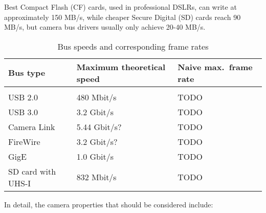 Best Compact Flash (CF) cards, used in professional DSLRs, can write at approximately 150 MB/s, while cheaper Secure Digital (SD) cards reach 90 MB/s, but camera bus drivers usually only achieve 20-40 MB/s. %

\begin{table}[h]
	\centering
	\begin{tabular}{l l l}
		Bus type & Maximum theoretical speed & Naive max.\ frame rate\\
		\hline \\
		USB 2.0 & 480 Mbit/s & TODO\\
		USB 3.0 & 3.2 Gbit/s & TODO\\
		Camera Link & 5.44 Gbit/s? & TODO\\
		FireWire & 3.2 Gbit/s? & TODO\\
		GigE & 1.0 Gbit/s & TODO\\
		SD card with UHS-I & 832 Mbit/s & TODO\\
	\end{tabular}
	\caption{Bus speeds and corresponding frame rates}
	\label{tab:busspeeds}
\end{table}

In detail, the camera properties that should be considered include:

